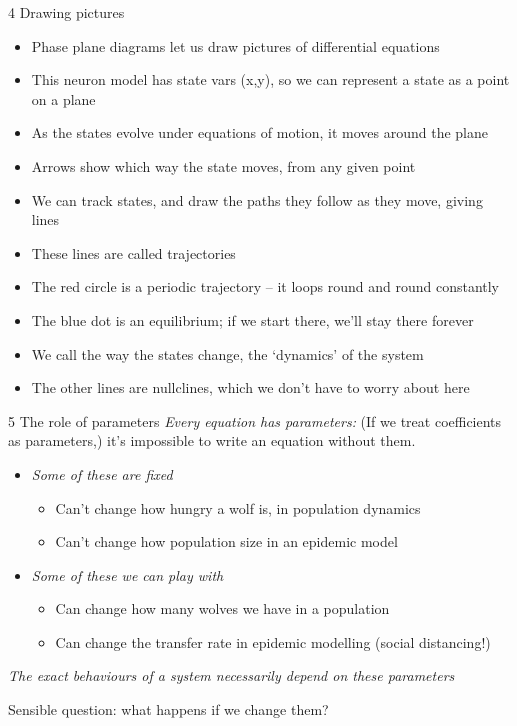 \documentclass[presentation]{beamer}
\begin{document}
\begin{frame}[label={sec:org42f6382}]{4 Drawing pictures}
\begin{itemize}
\item Phase plane diagrams let us draw pictures of differential equations
\item This neuron model has state vars (x,y), so we can represent a state as a point on a plane
\item As the states evolve under equations of motion, it moves around the plane
\item Arrows show which way the state moves, from any given point
\item We can track states, and draw the paths they follow as they move, giving lines
\item These lines are called trajectories
\item The red circle is a periodic trajectory -- it loops round and round constantly
\item The blue dot is an equilibrium; if we start there, we'll stay there forever
\item We call the way the states change, the `dynamics' of the system
\item The other lines are nullclines, which we don't have to worry about here
\end{itemize}
\end{frame}

\begin{frame}[label={sec:org97c9416}]{5 The role of parameters}
\emph{Every equation has parameters:}
(If we treat coefficients as parameters,) it's impossible to write an equation without them.
\begin{itemize}
\item \emph{Some of these are fixed}
\begin{itemize}
\item Can't change how hungry a wolf is, in population dynamics
\item Can't change how population size in an epidemic model
\end{itemize}
\item \emph{Some of these we can play with}
\begin{itemize}
\item Can change how many wolves we have in a population
\item Can change the transfer rate in epidemic modelling (social distancing!)
\end{itemize}
\end{itemize}

\emph{The exact behaviours of a system necessarily depend on these parameters}

Sensible question: what happens if we change them?
\end{frame}
\end{document}
